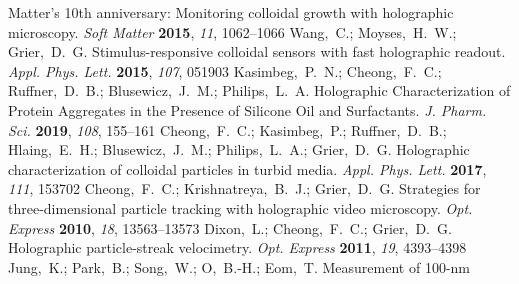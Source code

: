 \documentclass[journal=langd5,manuscript=article]{achemso}
\begin{document}
\begin{mcitethebibliography}{47}
  Matter's 10th anniversary: Monitoring colloidal growth with holographic
  microscopy. \emph{Soft Matter} \textbf{2015}, \emph{11}, 1062--1066\relax
\mciteBstWouldAddEndPuncttrue
\mciteSetBstMidEndSepPunct{\mcitedefaultmidpunct}
{\mcitedefaultendpunct}{\mcitedefaultseppunct}\relax
\EndOfBibitem
{}
Wang,~C.; Moyses,~H.~W.; Grier,~D.~G. Stimulus-responsive colloidal sensors
  with fast holographic readout. \emph{Appl. Phys. Lett.} \textbf{2015},
  \emph{107}, 051903\relax
\mciteBstWouldAddEndPuncttrue
\mciteSetBstMidEndSepPunct{\mcitedefaultmidpunct}
{\mcitedefaultendpunct}{\mcitedefaultseppunct}\relax
\EndOfBibitem
{}
Kasimbeg,~P.~N.; Cheong,~F.~C.; Ruffner,~D.~B.; Blusewicz,~J.~M.;
  Philips,~L.~A. Holographic Characterization of Protein Aggregates in the
  Presence of Silicone Oil and Surfactants. \emph{J. Pharm. Sci.}
  \textbf{2019}, \emph{108}, 155--161\relax
\mciteBstWouldAddEndPuncttrue
\mciteSetBstMidEndSepPunct{\mcitedefaultmidpunct}
{\mcitedefaultendpunct}{\mcitedefaultseppunct}\relax
\EndOfBibitem
{}
Cheong,~F.~C.; Kasimbeg,~P.; Ruffner,~D.~B.; Hlaing,~E.~H.; Blusewicz,~J.~M.;
  Philips,~L.~A.; Grier,~D.~G. Holographic characterization of colloidal
  particles in turbid media. \emph{Appl. Phys. Lett.} \textbf{2017},
  \emph{111}, 153702\relax
\mciteBstWouldAddEndPuncttrue
\mciteSetBstMidEndSepPunct{\mcitedefaultmidpunct}
{\mcitedefaultendpunct}{\mcitedefaultseppunct}\relax
\EndOfBibitem
{}
Cheong,~F.~C.; Krishnatreya,~B.~J.; Grier,~D.~G. Strategies for
  three-dimensional particle tracking with holographic video microscopy.
  \emph{Opt. Express} \textbf{2010}, \emph{18}, 13563--13573\relax
\mciteBstWouldAddEndPuncttrue
\mciteSetBstMidEndSepPunct{\mcitedefaultmidpunct}
{\mcitedefaultendpunct}{\mcitedefaultseppunct}\relax
\EndOfBibitem
{}
Dixon,~L.; Cheong,~F.~C.; Grier,~D.~G. Holographic particle-streak velocimetry.
  \emph{Opt. Express} \textbf{2011}, \emph{19}, 4393--4398\relax
\mciteBstWouldAddEndPuncttrue
\mciteSetBstMidEndSepPunct{\mcitedefaultmidpunct}
{\mcitedefaultendpunct}{\mcitedefaultseppunct}\relax
\EndOfBibitem
{}
Jung,~K.; Park,~B.; Song,~W.; O,~B.-H.; Eom,~T. Measurement of 100-nm

\end{mcitethebibliography}
\end{document}
